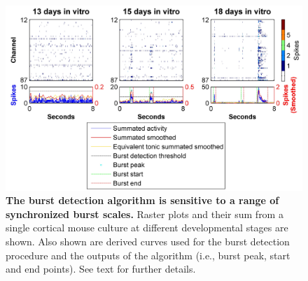 \label{sec:methods:burstDetection}
\begin{figure}[!htb]
            \centering
            \includegraphics[width=15cm]{chapter2/figures/burstDetection/burstDetExample.jpg}
            \caption[Examples of burst detection output]{\textbf{The burst detection algorithm is sensitive to a range of synchronized burst scales.} Raster plots and their sum from a single cortical mouse culture at different developmental stages are shown. Also shown are derived curves used for the burst detection procedure and the outputs of the algorithm (i.e., burst peak, start and end points). See text for further details.}
            \label{fig:methods:burstDet}
          \end{figure}

